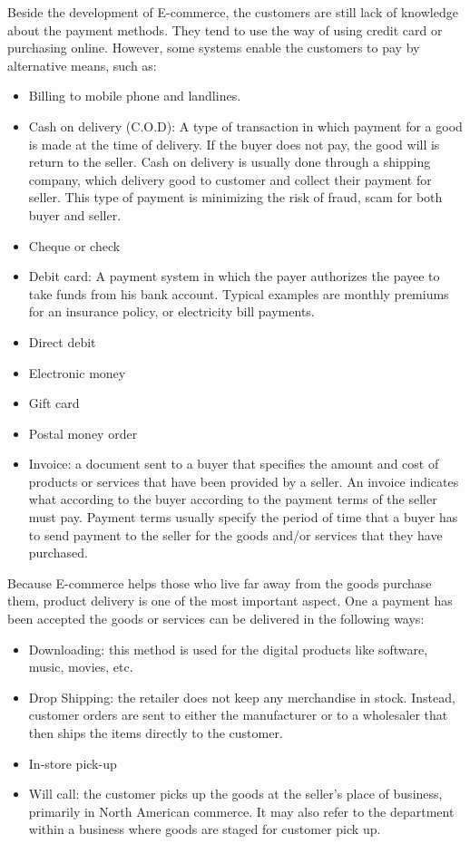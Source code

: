 \documentclass[conference]{IEEEtran}
\begin{document}
Beside the development of E-commerce, the customers are still lack of knowledge about the payment methods. They tend to use the way of using credit card or purchasing online. However, some systems enable the customers to pay by alternative means, such as:


\begin{itemize}
 \item Billing to mobile phone and landlines. \cite{HowtoRunDropShip}
  \item Cash on delivery (C.O.D): A type of transaction in which payment for a good is made at the time of delivery. If the buyer does not pay, the good will is return to the seller. Cash on delivery is usually done through a shipping company, which delivery good to customer and collect their payment for seller. This type of payment is minimizing the risk of fraud, scam for both buyer and seller. \cite{cod2015}
  \item Cheque or check
  \item Debit card: A payment system in which the payer authorizes the payee to take funds from his bank account. Typical examples are monthly premiums for an insurance policy, or electricity bill payments. \cite{directdebit2015}
  \item Direct debit
  \item Electronic money
  \item Gift card
  \item Postal money order
  \item Invoice: a document sent to a buyer that specifies the amount and cost of products or services that have been provided by a seller. An invoice indicates what according to the buyer according to the payment terms of the seller must pay. Payment terms usually specify the period of time that a buyer has to send payment to the seller for the goods and/or services that they have purchased. \cite{invoice2015}
\end{itemize}

Because E-commerce helps those who live far away from the goods purchase them, product delivery is one of the most important aspect. One a payment has been accepted the goods or services can be delivered in the following ways:

\begin{itemize}
\item Downloading: this method is used for the digital products like software, music, movies, etc.
\item Drop Shipping: the retailer does not keep any merchandise in stock. Instead, customer orders are sent to either the manufacturer or to a wholesaler that then ships the items directly to the customer. 
\cite{HowtoRunDropShip}
\item In-store pick-up 
\item Will call: the customer picks up the goods at the seller's place of business, primarily in North American commerce. It may also refer to the department within a business where goods are staged for customer pick up.
\end{itemize}
\end{document}
